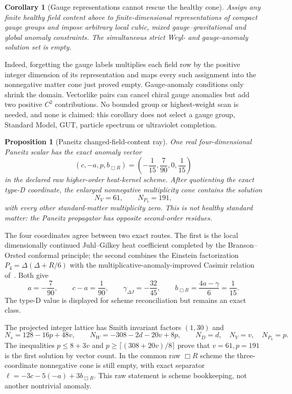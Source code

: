 \documentclass[11pt]{article}
\newtheorem{proposition}[theorem]{Proposition}
\newtheorem{corollary}[theorem]{Corollary}
\theoremstyle{definition}
\theoremstyle{remark}
\begin{document}
\begin{corollary}[Gauge representations cannot rescue the healthy cone]
Assign any finite healthy field content above to finite-dimensional
representations of compact gauge groups and impose arbitrary local cubic,
mixed gauge--gravitational and global anomaly constraints.  The simultaneous
strict Weyl- and gauge-anomaly solution set is empty.
\end{corollary}

Indeed, forgetting the gauge labels multiplies each field row by the positive
integer dimension of its representation and maps every such assignment into
the nonnegative matter cone just proved empty.  Gauge-anomaly conditions only
shrink the domain.  Vectorlike pairs can cancel chiral gauge anomalies but add
two positive \(C^2\) contributions.  No bounded group or highest-weight scan
is needed, and none is claimed: this corollary does not select a gauge group,
Standard Model, GUT, particle spectrum or ultraviolet completion.

\begin{proposition}[Paneitz changed-field-content ray]
One real four-dimensional Paneitz scalar has the exact anomaly vector
\[
 (c,-a,p,b_{\Box R})
 =
 \left(-\frac1{15},\frac7{90},0,\frac1{15}\right)
\]
in the declared raw higher-order heat-kernel scheme.  After quotienting the
exact type-D coordinate, the enlarged nonnegative multiplicity cone contains
the solution
\[
 N_V=61,\qquad N_{P_4}=191,
\]
with every other standard-matter multiplicity zero.  This is not healthy
standard matter: the Paneitz propagator has opposite second-order residues.
\end{proposition}

The four coordinates agree between two exact routes.  The first is the local
dimensionally continued Juhl--Gilkey heat coefficient completed by the
Branson--Orsted conformal principle; the second combines the Einstein
factorization \(P_4=\Delta(\Delta+R/6)\) with the
multiplicative-anomaly-improved Casimir relation
of~\cite{BuginiDiazGJMS,ArosEtAlGJMS}.  Both give
\[
 a=-\frac7{90},\qquad c-a=\frac1{90},\qquad
 \gamma_{\Delta J}=-\frac{32}{45},
 \qquad b_{\Box R}=\frac{4a-\gamma}{6}=\frac1{15}.
\]
The type-D value is displayed for scheme reconciliation but remains an exact
class.

The projected integer lattice has Smith invariant factors \((1,30)\) and
\[
 N_s=128-16p+48v,\qquad
 N_W=-308-2d-20v+8p,\qquad
 N_D=d,\quad N_V=v,\quad N_{P_4}=p .
\]
The inequalities \(p\leq8+3v\) and
\(p\geq\lceil(308+20v)/8\rceil\) prove that \(v=61,p=191\) is the
first solution by vector count.  In the common raw \(\Box R\) scheme the
three-coordinate nonnegative cone is still empty, with exact separator
\(\ell=-3c-5(-a)+3b_{\Box R}\).  This raw statement is scheme bookkeeping,
not another nontrivial anomaly.
\end{document}
